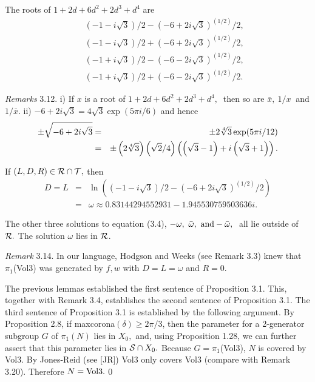   The roots of $1+2d+6d^2+2d^3+d^4$ are
\begin{eqnarray*}
&&\left(-1 - i\sqrt3\right)/2 - \left(-6 + 2i\sqrt3\right)^{(1/2)}/2,\\
&& \left(-1 - i\sqrt3\right)/2 + \left(-6 + 2i\sqrt3\right)^{(1/2)}/2,\\
&&\left(-1 + i\sqrt3\right)/2 - \left(-6 - 2i\sqrt3\right)^{(1/2)}/2,\\
&& \left(-1 + i\sqrt3\right)/2 + \left(-6 - 2i\sqrt3\right)^{(1/2)}/2. 
\end{eqnarray*}
 \endproclaim

{\it Remarks} 3.12.  i)  If $x$ is a root of $1+2d+6d^2+2d^3+d^4,\ $ then so are
$\bar x,\  1/x\ $ and $1/\bar x.$
ii)  $-6 + 2i \sqrt{3} = 4 \sqrt{3} \exp(5\pi i/6)$ and hence
\begin{eqnarray*}
\pm \sqrt{-6 + 2i \sqrt{3}} &=& \pm 2 \root 4 \of {3} \exp(5\pi i/12)\\
&=& \pm \left(2 \root 4 \of {3}\right) \left(\sqrt{2}/4\right) \left(\left(\sqrt{3} - 1\right) + i \left(\sqrt{3} +
1\right)\right).
\end{eqnarray*}

 If $(L,D,R) \in \cal R \cap {\cal T},$ then 
\begin{eqnarray*}
D=L&=&\ln\left(
\left(-1 - i\sqrt3\right)/2 - \left(-6 + 2i\sqrt3\right)^{(1/2)}/2\right)\\
&=&\omega
\approx 0.83144294552931 - 1.945530759503636i.
\end{eqnarray*}
\endproclaim

  The other three solutions to equation (3.4), $-\omega, \ \bar \omega, \ {\rm and} -\bar \omega,\ $
all lie 
 outside of ${\cal R}.$  The solution $\omega$ lies in ${\cal R}$.\enddemo

{\it Remark} 3.14. In our language, Hodgson and Weeks (see Remark 3.3)  knew that $\pi_1$(Vol3)
was generated by $f,w$ with $D=L=\omega$  and $R=0.$  

The previous lemmas established the first sentence of Proposition 3.1.
This, together with Remark 3.4, establishes the second sentence
of Proposition 3.1. The third sentence of Proposition 3.1 is 
established by the following argument.
By Proposition 2.8, if
maxcorona$(\delta)\ge 2\pi/3$, then the parameter for a 2-generator subgroup $G$ of $\pi_1(N)$ lies in
$X_0,$ and, using Proposition 1.28, we can further assert that 
this parameter lies in ${\cal S} \cap X_0.$  
Because $G= \pi_1$(Vol3), $N$ is covered by Vol3.  
By Jones-Reid (see [JR]) Vol3
only covers Vol3 (compare with Remark 3.20).  
Therefore $N = {\rm Vol3}.$\hfill\qed
\enddemo

